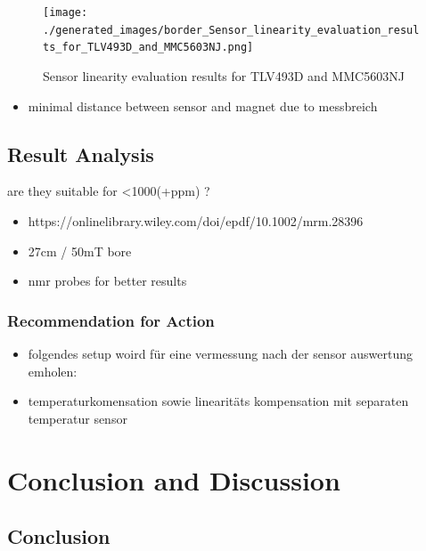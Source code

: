 \begin{figure}
\centering
\texttt{[image: ./generated\_images/border\_Sensor\_linearity\_evaluation\_results\_for\_TLV493D\_and\_MMC5603NJ.png]}
\caption{Sensor linearity evaluation results for TLV493D and MMC5603NJ
\label{Sensor_linearity_evaluation_results_for_TLV493D_and_MMC5603NJ.png}}
\end{figure}

\begin{itemize}
\tightlist
\item
  minimal distance between sensor and magnet due to messbreich
\end{itemize}

\hypertarget{result-analysis-1}{%
\section{Result Analysis}\label{result-analysis-1}}

are they suitable for <1000(+\gls{ppm}) ?

\begin{itemize}
\tightlist
\item
  https://onlinelibrary.wiley.com/doi/epdf/10.1002/mrm.28396
\item
  27cm / 50mT bore
\item
  nmr probes for better results
\end{itemize}

\hypertarget{recommendation-for-action}{%
\subsection{Recommendation for Action}\label{recommendation-for-action}}

\begin{itemize}
\tightlist
\item
  folgendes setup woird für eine vermessung nach der sensor auswertung
  emholen:
\item
  temperaturkomensation sowie linearitäts kompensation mit separaten
  temperatur sensor
\end{itemize}

\hypertarget{conclusion-and-discussion}{%
\chapter{Conclusion and Discussion}\label{conclusion-and-discussion}}

\hypertarget{conclusion}{%
\section{Conclusion}\label{conclusion}}

